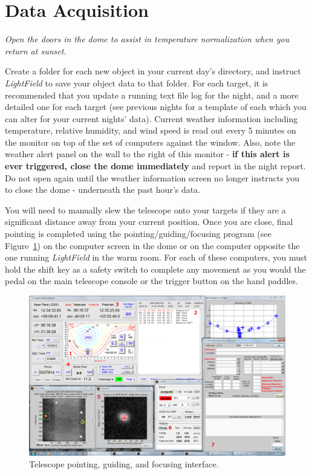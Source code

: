 \documentclass[12pt]{article}
\begin{document}
\section{Data Acquisition}\label{acquisition}
\textit{Open the doors in the dome to assist in temperature normalization when you return at sunset.}\par
Create a folder for each new object in your current day's directory, and instruct \textit{LightField} to save your object data to that folder. For each target, it is recommended that you update a running text file log for the night, and a more detailed one for each target (see previous nights for a template of each which you can alter for your current nights' data). Current weather information including temperature, relative humidity, and wind speed is read out every 5 minutes on the monitor on top of the set of computers against the window. Also, note the weather alert panel on the wall to the right of this monitor - \textbf{if this alert is ever triggered, close the dome immediately} and report in the night report. Do not open again until the weather information screen no longer instructs you to close the dome - underneath the past hour's data.\par
\indent You will need to manually slew the telescope onto your targets if they are a significant distance away from your current position. Once you are close, final pointing is completed using the pointing/guiding/focusing program (see Figure~\ref{fig:point}) on the computer screen in the dome or on the computer opposite the one running \textit{LightField} in the warm room. For each of these computers, you must hold the shift key as a safety switch to complete any movement as you would the pedal on the main telescope console or the trigger button on the hand paddles.\par

\begin{figure}[!t]
   \centering
   \includegraphics[width=\textwidth]{pointing.png}
   \caption{Telescope pointing, guiding, and focusing interface.\label{fig:point}}
\end{figure}
\end{document}
